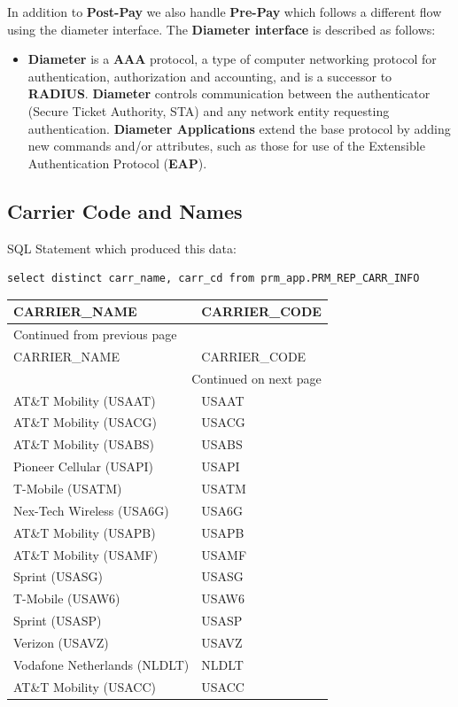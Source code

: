 \documentclass[12pt,twoside]{article}
\begin{document}
In addition to \textbf{Post-Pay} we also handle \textbf{Pre-Pay} which follows a
different flow using the diameter interface. The \textbf{Diameter
interface} is described as follows:

\begin{itemize}
\item \textbf{Diameter} is a \textbf{AAA} protocol, a type of computer networking
protocol for authentication, authorization and accounting, and
is a successor to \textbf{RADIUS}. \textbf{Diameter} controls communication
between the authenticator (Secure Ticket Authority, STA) and
any network entity requesting authentication. \textbf{Diameter
Applications} extend the base protocol by adding new commands
and/or attributes, such as those for use of the Extensible
Authentication Protocol (\textbf{EAP}).
\end{itemize}
\subsection{Carrier Code and Names}
\label{sec:orgheadline18}
SQL Statement which produced this data:
\begin{verbatim}
select distinct carr_name, carr_cd from prm_app.PRM_REP_CARR_INFO
\end{verbatim}
\footnotesize

\begin{longtable}{l|l}
\hline
CARRIER\_NAME & CARRIER\_CODE\\
\hline
\endfirsthead
\multicolumn{2}{l}{Continued from previous page} \\
\hline

CARRIER\_NAME & CARRIER\_CODE \\

\hline
\endhead
\hline\multicolumn{2}{r}{Continued on next page} \\
\endfoot
\endlastfoot
\hline
AT\&T Mobility (USAAT) & USAAT\\
AT\&T Mobility (USACG) & USACG\\
AT\&T Mobility (USABS) & USABS\\
Pioneer Cellular (USAPI) & USAPI\\
T-Mobile (USATM) & USATM\\
Nex-Tech Wireless (USA6G) & USA6G\\
AT\&T Mobility (USAPB) & USAPB\\
AT\&T Mobility (USAMF) & USAMF\\
Sprint (USASG) & USASG\\
T-Mobile (USAW6) & USAW6\\
Sprint (USASP) & USASP\\
Verizon (USAVZ) & USAVZ\\
Vodafone Netherlands (NLDLT) & NLDLT\\
AT\&T Mobility (USACC) & USACC\\
\hline
\end{longtable}
\normalsize
\end{document}
